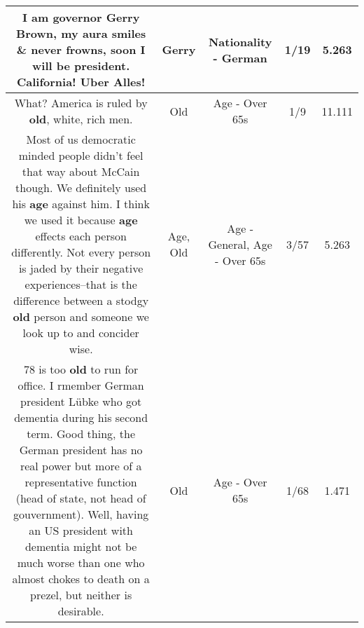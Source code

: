 \documentclass[11pt]{article}
\newlength\mylength
\begin{document}
\begin{center}
\begin{longtable}{|C{.65\mylength}|C{.30\mylength}|C{.12\mylength}|C{.12\mylength}|C{.12\mylength}|}
  \small I am governor \textbf{Gerry} Brown, my aura smiles \& never frowns, soon I will be president. California! Uber Alles!\normalsize   & Gerry & Nationality - German & 1/19 & 5.263 \\  \hline
  \small What? America is ruled by \textbf{old}, white, rich men.\normalsize   & Old & Age - Over 65s & 1/9 & 11.111 \\  \hline
  \small Most of us democratic minded people didn't feel that way about McCain though. We definitely used his \textbf{age} against him. I think we used it because \textbf{age} effects each person differently.  Not every person is jaded by their negative experiences--that is the difference between a stodgy \textbf{old} person and someone we look up to and concider wise.\normalsize   & Age, Old & Age - General, Age - Over 65s & 3/57 & 5.263 \\  \hline
  \small 78 is too \textbf{old} to run for office. I rmember German president Lübke who got dementia during his second term. Good thing, the German president has no real power but more of a representative function (head of state, not head of gouvernment). Well, having an US president with dementia might not be much worse than one who almost chokes to death on a prezel, but neither is desirable.\normalsize   & Old & Age - Over 65s & 1/68 & 1.471 \\  \hline

\end{longtable}
\end{center}
\end{document}
